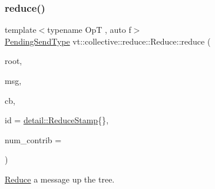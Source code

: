 \mbox{\label{structvt_1_1collective_1_1reduce_1_1_reduce_a715bd2de0a6af6294657cf684291228f}} 
\subsubsection{\texorpdfstring{reduce()}{reduce()}\hspace{0.1cm}{\footnotesize\ttfamily [7/10]}}
{\footnotesize\ttfamily template$<$typename OpT , auto f$>$ \\
\hyperlink{structvt_1_1collective_1_1reduce_1_1_reduce_a0474b491f3c93014d9a0ce0356c6bfd5}{Pending\+Send\+Type} vt\+::collective\+::reduce\+::\+Reduce\+::reduce (\begin{DoxyParamCaption}\item[{\hyperlink{namespacevt_a866da9d0efc19c0a1ce79e9e492f47e2}{Node\+Type} const \&}]{root,  }\item[{typename \hyperlink{structvt_1_1_func_traits}{Func\+Traits}$<$ decltype(f)$>$\+::MsgT $\ast$}]{msg,  }\item[{\hyperlink{namespacevt_a57b238783d05de96bc2c4027f7073b7f}{Callback}$<$ typename \hyperlink{structvt_1_1_func_traits}{Func\+Traits}$<$ decltype(f)$>$\+::MsgT $>$}]{cb,  }\item[{\hyperlink{namespacevt_1_1collective_1_1reduce_1_1detail_aacc1fcd729d934ba143fee3a943bf9e7}{detail\+::\+Reduce\+Stamp}}]{id = {\ttfamily \hyperlink{namespacevt_1_1collective_1_1reduce_1_1detail_aacc1fcd729d934ba143fee3a943bf9e7}{detail\+::\+Reduce\+Stamp}\{\}},  }\item[{\hyperlink{structvt_1_1collective_1_1reduce_1_1_reduce_a6c3e63aca10c31d2823b0b18cf9762a4}{Reduce\+Num\+Type} const \&}]{num\+\_\+contrib = {} }\end{DoxyParamCaption})\hspace{0.3cm}{\ttfamily [inline]}}



\hyperlink{structvt_1_1collective_1_1reduce_1_1_reduce}{Reduce} a message up the tree. 


